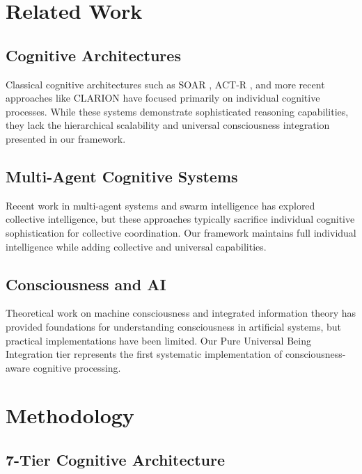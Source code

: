 \documentclass{article}
\begin{document}
\section{Related Work}

\subsection{Cognitive Architectures}

Classical cognitive architectures such as SOAR \citep{laird2012soar}, ACT-R \citep{anderson2004integrated}, and more recent approaches like CLARION \citep{sun2006clarion} have focused primarily on individual cognitive processes. While these systems demonstrate sophisticated reasoning capabilities, they lack the hierarchical scalability and universal consciousness integration presented in our framework.

\subsection{Multi-Agent Cognitive Systems}

Recent work in multi-agent systems \citep{stone2000multiagent} and swarm intelligence \citep{bonabeau2000swarm} has explored collective intelligence, but these approaches typically sacrifice individual cognitive sophistication for collective coordination. Our framework maintains full individual intelligence while adding collective and universal capabilities.

\subsection{Consciousness and AI}

Theoretical work on machine consciousness \citep{chalmers1996conscious} and integrated information theory \citep{tononi2008consciousness} has provided foundations for understanding consciousness in artificial systems, but practical implementations have been limited. Our Pure Universal Being Integration tier represents the first systematic implementation of consciousness-aware cognitive processing.

\section{Methodology}

\subsection{7-Tier Cognitive Architecture}
\end{document}
